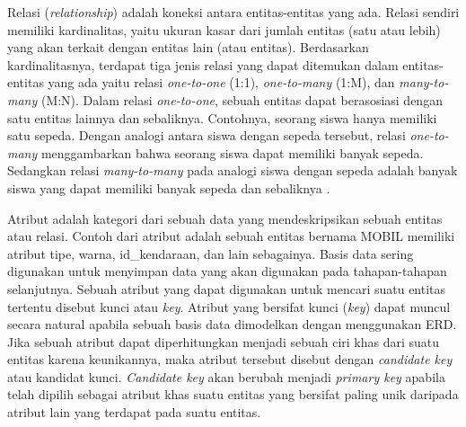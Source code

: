 	Relasi (\emph{relationship}) adalah koneksi antara entitas-entitas yang ada. Relasi sendiri memiliki kardinalitas, yaitu ukuran kasar dari jumlah entitas (satu atau lebih) yang akan terkait dengan entitas lain (atau entitas). Berdasarkan kardinalitasnya, terdapat tiga jenis relasi yang dapat ditemukan dalam entitas-entitas yang ada yaitu relasi \emph{one-to-one} (1:1), \emph{one-to-many} (1:M), dan \emph{many-to-many} (M:N). Dalam relasi \emph{one-to-one}, sebuah entitas dapat berasosiasi dengan satu entitas lainnya dan sebaliknya. Contohnya, seorang siswa hanya memiliki satu sepeda. Dengan analogi antara siswa dengan sepeda tersebut, relasi \emph{one-to-many} menggambarkan bahwa seorang siswa dapat memiliki banyak sepeda. Sedangkan relasi \emph{many-to-many} pada analogi siswa dengan sepeda adalah banyak siswa yang dapat memiliki banyak sepeda dan sebaliknya \cite{bagui}. 
	
	Atribut adalah kategori dari sebuah data yang mendeskripsikan sebuah entitas atau relasi. Contoh dari atribut adalah sebuah entitas bernama MOBIL memiliki atribut tipe, warna, id\_kendaraan, dan lain sebagainya. Basis data sering digunakan untuk menyimpan data yang akan digunakan pada tahapan-tahapan selanjutnya. Sebuah atribut yang dapat digunakan untuk mencari suatu entitas tertentu disebut kunci atau \emph{key}. Atribut yang bersifat kunci (\emph{key}) dapat muncul secara natural apabila sebuah basis data dimodelkan dengan menggunakan ERD. Jika sebuah atribut dapat diperhitungkan menjadi sebuah ciri khas dari suatu entitas karena keunikannya, maka atribut tersebut disebut dengan \emph{candidate key} atau kandidat kunci. \emph{Candidate key} akan berubah menjadi \emph{primary key} apabila telah dipilih sebagai atribut khas suatu entitas yang bersifat paling unik daripada atribut lain yang terdapat pada suatu entitas.
	
